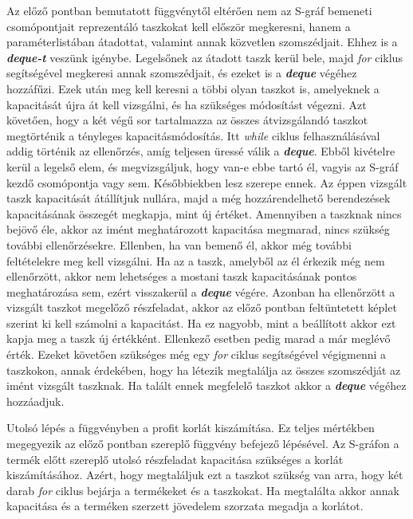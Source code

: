 Az előző pontban bemutatott függvénytől eltérően nem az S-gráf bemeneti csomópontjait reprezentáló taszkokat kell először megkeresni, hanem a paraméterlistában átadottat, valamint annak közvetlen szomszédjait. Ehhez is a \textbf{\textit{deque-t}} veszünk igénybe. Legelsőnek az átadott taszk kerül bele, majd \textit{for} ciklus segítségével megkeresi annak szomszédjait, és ezeket is a \textbf{\textit{deque}} végéhez hozzáfűzi. Ezek után meg kell keresni a többi olyan taszkot is, amelyeknek a kapacitását újra át kell vizsgálni, és ha szükséges módosítást végezni. Azt követően, hogy a két végű sor tartalmazza az összes átvizsgálandó taszkot megtörténik a tényleges kapacitásmódosítás. Itt \textit{while} ciklus felhasználásával addig történik az ellenőrzés, amíg teljesen üressé válik a \textbf{\textit{deque}}. Ebből kivételre kerül a legelső elem, és megvizsgáljuk, hogy van-e ebbe tartó él, vagyis az S-gráf kezdő csomópontja vagy sem. Későbbiekben lesz szerepe ennek. Az éppen vizsgált taszk kapacitását átállítjuk nullára, majd a még hozzárendelhető berendezések kapacitásának összegét megkapja, mint új értéket. Amennyiben a taszknak nincs bejövő éle, akkor az imént meghatározott kapacitása megmarad, nincs szükség további ellenőrzésekre. Ellenben, ha van bemenő él, akkor még további feltételekre meg kell vizsgálni. Ha az a taszk, amelyből az él érkezik még nem ellenőrzött, akkor nem lehetséges a mostani taszk kapacitásának pontos meghatározása sem, ezért visszakerül a \textbf{\textit{deque}} végére. Azonban ha ellenőrzött a vizsgált taszkot megelőző részfeladat, akkor az előző pontban feltüntetett képlet szerint ki kell számolni a kapacitást. Ha ez nagyobb, mint a beállított akkor ezt kapja meg a taszk új értékként. Ellenkező esetben pedig marad a már meglévő érték. Ezeket követően szükséges még egy \textit{for} ciklus segítségével végigmenni a taszkokon, annak érdekében, hogy ha létezik megtalálja az összes szomszédját az imént vizsgált taszknak. Ha talált ennek megfelelő taszkot akkor a \textbf{\textit{deque}} végéhez hozzáadjuk.

Utolsó lépés a függvényben a profit korlát kiszámítása. Ez teljes mértékben megegyezik az előző pontban szereplő függvény befejező lépésével. Az S-gráfon a termék előtt szereplő utolsó részfeladat kapacitása szükséges a korlát kiszámításához. Azért, hogy megtaláljuk ezt a taszkot szükség van arra, hogy két darab \textit{for} ciklus bejárja a termékeket és a taszkokat. Ha megtalálta akkor annak kapacitása és a terméken szerzett jövedelem szorzata megadja a korlátot.

